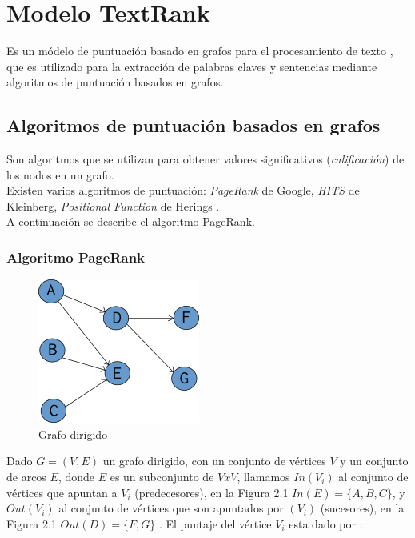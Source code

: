 \section{Modelo TextRank}
Es un m\'odelo de puntuaci\'on basado en grafos para el procesamiento de
texto \cite{RMPT04}, que es utilizado para la extracci\'on de palabras claves
y sentencias mediante algoritmos de puntuaci\'on basados en grafos.

\subsection{Algoritmos de puntuaci\'on basados en grafos}
Son algoritmos que se utilizan para obtener valores significativos
(\emph{calificaci\'on}) de los nodos en un grafo. \\

Existen varios algoritmos de puntuaci\'on: \emph{PageRank} de Google,
\emph{HITS} de Kleinberg, \emph{Positional Function} de Herings \cite{RM04}. \\

A continuaci\'on se describe el algoritmo PageRank.

\subsubsection{Algoritmo PageRank}
\begin{figure}
	\centering
		\includegraphics[]{recursos/img/grafoDirigido.png}
		\caption {Grafo dirigido}
\end{figure}

Dado $G=(V,E)$ un grafo dirigido, con un conjunto de v\'ertices $V$ y un conjunto
de arcos $E$, donde $E$ es un subconjunto de $V x V$, llamamos $In(V_i)$ al
conjunto de v\'ertices que apuntan a $V_i$ (predecesores),  en la Figura 2.1
$In(E)=\{A,B,C\}$, y $Out(V_i)$ al conjunto de v\'ertices que son apuntados por $(V_i)$
(sucesores), en la Figura 2.1 $Out(D)=\{F,G\}$ . El puntaje del v\'ertice $V_i$ 
esta dado por \cite{SBLP98}:

